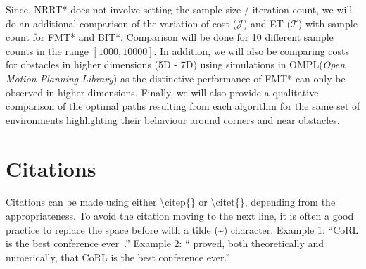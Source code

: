 \documentclass{article}
\begin{document}
Since, NRRT* does not involve setting the sample size / iteration count, we will do an additional comparison of the variation of cost ($\mathcal{J}$) and ET ($\mathcal{T}$) with sample count for FMT* and BIT*. Comparison will be done for 10 different sample counts in the range $[1000,10000]$. In addition, we will also be comparing costs for obstacles in higher dimensions (5D - 7D) using simulations in OMPL(\textit{Open Motion Planning Library}) as the distinctive performance of FMT* can only be observed in higher dimensions. Finally, we will also provide a qualitative comparison of the optimal paths resulting from each algorithm for the same set of environments highlighting their behaviour around corners and near obstacles.



\section{Citations}
\label{sec:citations}

	Citations can be made using either \textbackslash citep\{\} or \textbackslash citet\{\}, depending from the appropriateness. To avoid the citation moving to the next line, it is often a good practice to replace the space before with a tilde (\~{}) character.
	Example 1: ``CoRL is the best conference ever~\citep{Calandra2016}.''
	Example 2: ``\citet{Calandra2016} proved, both theoretically and numerically, that CoRL is the best conference ever.''
 


\clearpage


\end{document}

